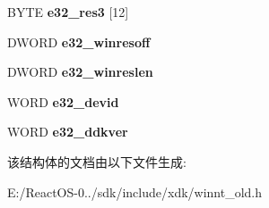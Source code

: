 \begin{DoxyCompactItemize}
B\+Y\+TE {\bfseries e32\+\_\+res3} \mbox{[}12\mbox{]}
\item 
\mbox{\label{struct___i_m_a_g_e___v_x_d___h_e_a_d_e_r_a7fe882feac75ad81cc8c22ef8fb51974}} 
D\+W\+O\+RD {\bfseries e32\+\_\+winresoff}
\item 
\mbox{\label{struct___i_m_a_g_e___v_x_d___h_e_a_d_e_r_a09ad670c515cd90a2e56eafc29cbddf0}} 
D\+W\+O\+RD {\bfseries e32\+\_\+winreslen}
\item 
\mbox{\label{struct___i_m_a_g_e___v_x_d___h_e_a_d_e_r_ae01c595ee575208d61f43eba6f914d2d}} 
W\+O\+RD {\bfseries e32\+\_\+devid}
\item 
\mbox{\label{struct___i_m_a_g_e___v_x_d___h_e_a_d_e_r_ace29a40aefb7467a2f2c549ddd6572f6}} 
W\+O\+RD {\bfseries e32\+\_\+ddkver}
\end{DoxyCompactItemize}


该结构体的文档由以下文件生成\+:\begin{DoxyCompactItemize}
\item 
E\+:/\+React\+O\+S-\/0../sdk/include/xdk/winnt\+\_\+old.\+h\end{DoxyCompactItemize}
